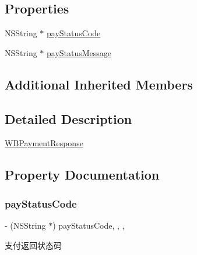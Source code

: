 \subsection*{Properties}
\begin{DoxyCompactItemize}
\item 
N\+S\+String $\ast$ \mbox{\hyperlink{interface_w_b_payment_response_ae54332de58e4dfd0043fd027e716e667}{pay\+Status\+Code}}
\item 
N\+S\+String $\ast$ \mbox{\hyperlink{interface_w_b_payment_response_a422cfda007ed3d6438d83df72919e529}{pay\+Status\+Message}}
\end{DoxyCompactItemize}
\subsection*{Additional Inherited Members}


\subsection{Detailed Description}
\mbox{\hyperlink{interface_w_b_payment_response}{W\+B\+Payment\+Response}} 

\subsection{Property Documentation}
\mbox{\label{interface_w_b_payment_response_ae54332de58e4dfd0043fd027e716e667}} 
\subsubsection{\texorpdfstring{pay\+Status\+Code}{payStatusCode}}
{\footnotesize\ttfamily -\/ (N\+S\+String $\ast$) pay\+Status\+Code\hspace{0.3cm}{\ttfamily [read]}, {\ttfamily [write]}, {\ttfamily [nonatomic]}, {\ttfamily [strong]}}

支付返回状态码 \mbox{\label{interface_w_b_payment_response_a422cfda007ed3d6438d83df72919e529}} 
